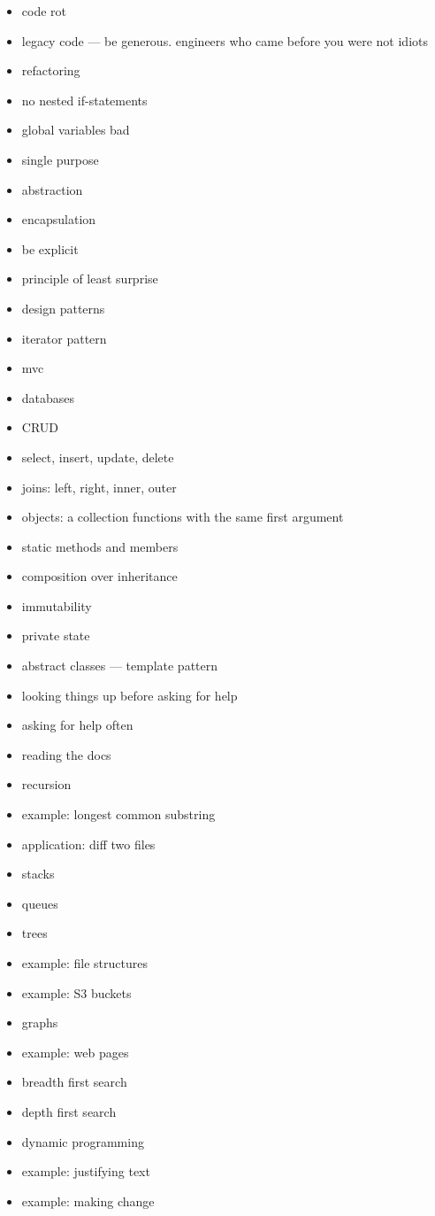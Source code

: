 \begin{itemize}
  \item code rot
\item legacy code --- be generous. engineers who came before you were not idiots  \item refactoring
  \item no nested if-statements
  \item global variables bad
  \item single purpose
  \item abstraction
  \item encapsulation
  \item be explicit
  \item principle of least surprise

  \item design patterns
  \item iterator pattern
  \item mvc
  \item databases
  \item CRUD
  \item select, insert, update, delete
  \item joins: left, right, inner, outer

  \item objects: a collection functions with the same first argument
  \item static methods and members
  \item composition over inheritance
  \item immutability
  \item private state
  \item abstract classes --- template pattern
  \item looking things up before asking for help
  \item asking for help often
  \item reading the docs

  \item recursion
  \item example: longest common substring
  \item application: diff two files
  \item stacks
  \item queues
  \item trees
  \item example: file structures
  \item example: S3 buckets
  \item graphs
  \item example: web pages
  \item breadth first search
  \item depth first search
  \item dynamic programming
  \item example: justifying text
  \item example: making change
\end{itemize}

